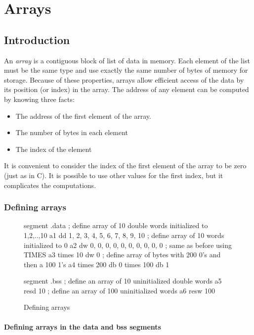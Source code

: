 \chapter{Arrays}
\section{Introduction}

An \emph{array} is a contiguous block of list of data in memory. Each element
of the list must be the same type and use exactly the same number of bytes
of memory for storage. Because of these properties, arrays allow efficient
access of the data by its position (or index) in the array. The address
of any element can be computed by knowing three facts:
\begin{itemize}
\item The address of the first element of the array.
\item The number of bytes in each element
\item The index of the element
\end{itemize}

It is convenient to consider the index of the first element of the array
to be zero (just as in C). It is possible to use other values for the
first index, but it complicates the computations.

\subsection{Defining arrays}

\begin{figure}[t]
\begin{AsmCodeListing}[frame=single]
segment .data
; define array of 10 double words initialized to 1,2,..,10
a1           dd   1, 2, 3, 4, 5, 6, 7, 8, 9, 10
; define array of 10 words initialized to 0
a2           dw   0, 0, 0, 0, 0, 0, 0, 0, 0, 0
; same as before using TIMES
a3           times 10 dw 0
; define array of bytes with 200 0's and then a 100 1's
a4           times 200 db 0
             times 100 db 1

segment .bss
; define an array of 10 uninitialized double words
a5           resd  10
; define an array of 100 uninitialized words
a6           resw  100
\end{AsmCodeListing}
\caption{Defining arrays\label{fig:DataArrays}}
\end{figure}

\subsubsection{Defining arrays in the {\code data} and {\code bss} segments
               }

